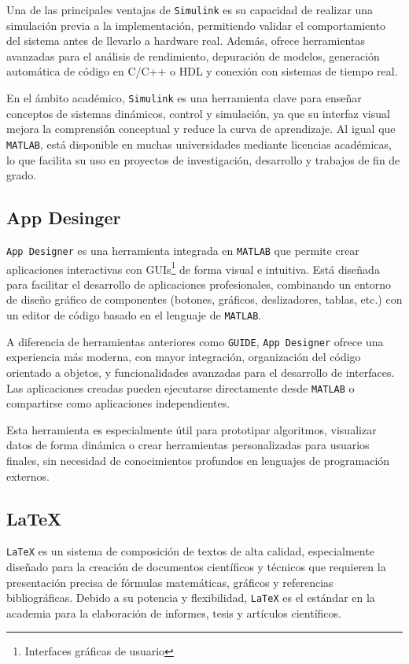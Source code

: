 Una de las principales ventajas de \texttt{Simulink} es su capacidad de realizar una simulación previa a la implementación, permitiendo validar el comportamiento del sistema antes de llevarlo a hardware real. Además, ofrece herramientas avanzadas para el análisis de rendimiento, depuración de modelos, generación automática de código en C/C++ o HDL y conexión con sistemas de tiempo real.

En el ámbito académico, \texttt{Simulink} es una herramienta clave para enseñar conceptos de sistemas dinámicos, control y simulación, ya que su interfaz visual mejora la comprensión conceptual y reduce la curva de aprendizaje. Al igual que \texttt{MATLAB}, está disponible en muchas universidades mediante licencias académicas, lo que facilita su uso en proyectos de investigación, desarrollo y trabajos de fin de grado.

\subsection{App Desinger}
\texttt{App Designer} \cite{mathworks_matlab} es una herramienta integrada en \texttt{MATLAB} que permite crear aplicaciones interactivas con GUIs\footnote{Interfaces gráficas de usuario} de forma visual e intuitiva. Está diseñada para facilitar el desarrollo de aplicaciones profesionales, combinando un entorno de diseño gráfico de componentes (botones, gráficos, deslizadores, tablas, etc.) con un editor de código basado en el lenguaje de \texttt{MATLAB}.

A diferencia de herramientas anteriores como \texttt{GUIDE}, \texttt{App Designer} ofrece una experiencia más moderna, con mayor integración, organización del código orientado a objetos, y funcionalidades avanzadas para el desarrollo de interfaces. Las aplicaciones creadas pueden ejecutarse directamente desde \texttt{MATLAB} o compartirse como aplicaciones independientes.

Esta herramienta es especialmente útil para prototipar algoritmos, visualizar datos de forma dinámica o crear herramientas personalizadas para usuarios finales, sin necesidad de conocimientos profundos en lenguajes de programación externos.

\subsection{LaTeX}
\texttt{LaTeX} \cite{latexproject} es un sistema de composición de textos de alta calidad, especialmente diseñado para la creación de documentos científicos y técnicos que requieren la presentación precisa de fórmulas matemáticas, gráficos y referencias bibliográficas. Debido a su potencia y flexibilidad, \texttt{LaTeX} es el estándar en la academia para la elaboración de informes, tesis y artículos científicos.

